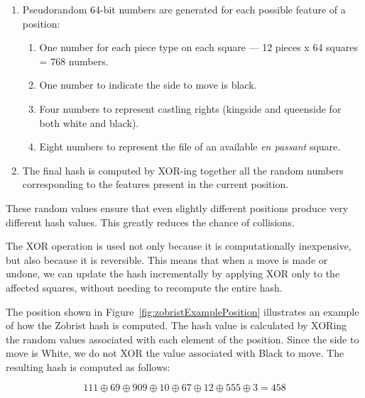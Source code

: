\begin{enumerate}
  \item Pseudorandom 64-bit numbers are generated for each possible feature of a position:
  \begin{enumerate}
    \item One number for each piece type on each square — 12 pieces x 64 squares = 768 numbers.
    \item One number to indicate the side to move is black.
    \item Four numbers to represent castling rights (kingside and queenside for both white and black).
    \item Eight numbers to represent the file of an available \textit{en passant} square.
  \end{enumerate}
  \item The final hash is computed by XOR-ing together all the random numbers corresponding to the features present in the current position.
\end{enumerate}

\noindent These random values ensure that even slightly different positions produce very different hash values. This greatly reduces the chance of collisions.

\vspace{1em}

\noindent The XOR operation is used not only because it is computationally inexpensive, but also because it is reversible. This means that when a move is made or undone, we can update the hash incrementally by applying XOR only to the affected squares, without needing to recompute the entire hash.

\vspace{1em}

\noindent The position shown in Figure~\ref{fig:zobristExamplePosition} illustrates an example of how the Zobrist hash is computed.  
The hash value is calculated by XORing the random values associated with each element of the position.  
Since the side to move is White, we do not XOR the value associated with Black to move.  
The resulting hash is computed as follows:

\[
111 \oplus 69 \oplus 909 \oplus 10 \oplus 67 \oplus 12 \oplus 555 \oplus 3 = 458
\]

\newpage

